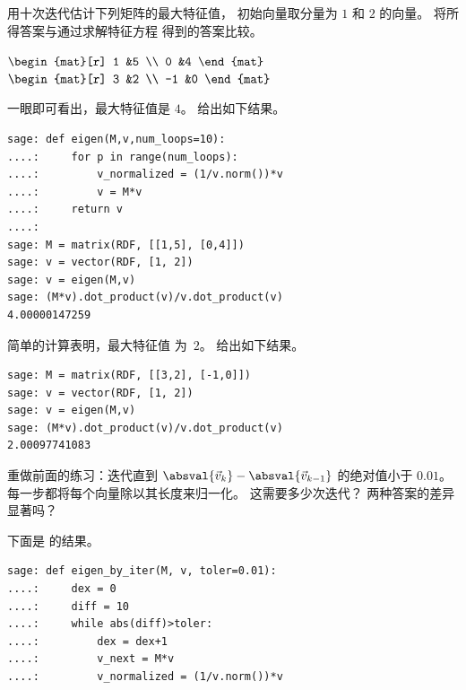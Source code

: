 \begin{exercises}
  \item
    用十次迭代估计下列矩阵的最大特征值，
    初始向量取分量为 $1$ 和 $2$ 的向量。
    将所得答案与通过求解特征方程
    得到的答案比较。
    \begin{exparts*}
      \partsitem $\begin{mat}[r]
                    1  &5  \\
                    0  &4
                  \end{mat}$
      \partsitem $\begin{mat}[r]
                    3   &2  \\
                    -1  &0
                  \end{mat}$
    \end{exparts*}
    \begin{answer}
     \begin{exparts}
       \partsitem 一眼即可看出，最大特征值是 $4$。
         \Sage{} 给出如下结果。
\begin{lstlisting}
sage: def eigen(M,v,num_loops=10):
....:     for p in range(num_loops):
....:         v_normalized = (1/v.norm())*v
....:         v = M*v
....:     return v
....:
sage: M = matrix(RDF, [[1,5], [0,4]])
sage: v = vector(RDF, [1, 2])
sage: v = eigen(M,v)
sage: (M*v).dot_product(v)/v.dot_product(v)
4.00000147259
\end{lstlisting}
       \partsitem 简单的计算表明，最大特征值
          为~$2$。
          \Sage{} 给出如下结果。
\begin{lstlisting}
sage: M = matrix(RDF, [[3,2], [-1,0]])
sage: v = vector(RDF, [1, 2])
sage: v = eigen(M,v)
sage: (M*v).dot_product(v)/v.dot_product(v)
2.00097741083
\end{lstlisting}
     \end{exparts}
    \end{answer}
  \item
     重做前面的练习：迭代直到
     $\absval{\vec{v}_k}-\absval{\vec{v}_{k-1}}$ 的绝对值小于
     $0.01$。
     每一步都将每个向量除以其长度来归一化。
     这需要多少次迭代？
     两种答案的差异显著吗？
     \begin{answer}
       \begin{exparts}
         \partsitem 下面是 \Sage{} 的结果。
 \begin{lstlisting}
sage: def eigen_by_iter(M, v, toler=0.01):
....:     dex = 0
....:     diff = 10
....:     while abs(diff)>toler:
....:         dex = dex+1
....:         v_next = M*v
....:         v_normalized = (1/v.norm())*v

\end{lstlisting}
\end{exparts}
\end{answer}
\end{exercises}
